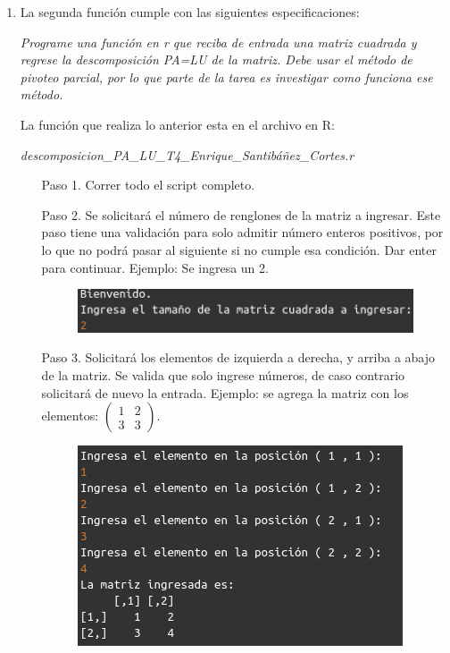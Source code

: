 \documentclass[11pt,letterpaper]{article}
\begin{document}
\begin{enumerate}
\item La segunda función cumple con las siguientes especificaciones:

\textit{Programe una función en r que reciba de entrada una matriz cuadrada y regrese la descomposición PA=LU de la matriz. Debe usar el método de pivoteo parcial, por lo que parte de la tarea es investigar como funciona ese método.}

La función que realiza lo anterior esta en el archivo en R:

\textit{descomposicion\_PA\_LU\_T4\_Enrique\_Santibáñez\_Cortes.r}

\begin{itemize}
\item[Paso 1.] Correr todo el script completo.

\item[Paso 2.] Se solicitará el número de renglones de la matriz a ingresar. Este paso tiene una validación para solo admitir número enteros positivos, por lo que no podrá pasar al siguiente si no cumple esa condición. Dar enter para continuar. Ejemplo: Se ingresa un 2.
\begin{figure}[H]
\centering
\includegraphics[scale=.7]{paso_2.png}
\end{figure}

\item[Paso 3.] Solicitará los elementos de izquierda a derecha, y arriba a abajo de la matriz. Se valida que solo ingrese números, de caso contrario solicitará de nuevo la entrada. Ejemplo: se agrega la matriz con los elementos: $\begin{pmatrix}
1&2\\
3&3
\end{pmatrix}$.
\begin{figure}[H]
\centering
\includegraphics[scale=.7]{paso_3.png}
\end{figure}


\end{itemize}
\end{enumerate}
\end{document}
